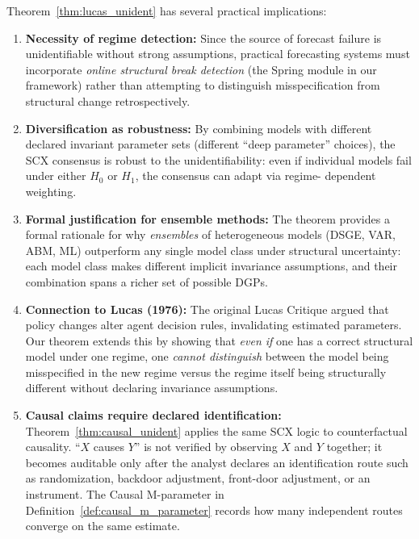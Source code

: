 \documentclass[12pt,a4paper]{article}
\begin{document}
Theorem~\ref{thm:lucas_unident} has several practical implications:

\begin{enumerate}[label=(\arabic*), leftmargin=*]
    \item \textbf{Necessity of regime detection:} Since the source of
    forecast failure is unidentifiable without strong assumptions,
    practical forecasting systems must incorporate \emph{online
    structural break detection} (the Spring module in our framework)
    rather than attempting to distinguish misspecification from
    structural change retrospectively.

    \item \textbf{Diversification as robustness:} By combining models
    with different declared invariant parameter sets (different
    ``deep parameter'' choices), the SCX consensus is robust to
    the unidentifiability: even if individual models fail under
    either $H_0$ or $H_1$, the consensus can adapt via regime-
    dependent weighting.

    \item \textbf{Formal justification for ensemble methods:} The
    theorem provides a formal rationale for why \emph{ensembles} of
    heterogeneous models (DSGE, VAR, ABM, ML) outperform any single
    model class under structural uncertainty: each model class makes
    different implicit invariance assumptions, and their combination
    spans a richer set of possible DGPs.

    \item \textbf{Connection to Lucas (1976):} The original Lucas
    Critique argued that policy changes alter agent decision rules,
    invalidating estimated parameters.  Our theorem extends this by
    showing that \emph{even if} one has a correct structural model
    under one regime, one \emph{cannot distinguish} between the
    model being misspecified in the new regime versus the regime
    itself being structurally different without declaring invariance
    assumptions.

    \item \textbf{Causal claims require declared identification:}
    Theorem~\ref{thm:causal_unident} applies the same SCX logic to
    counterfactual causality.  ``$X$ causes $Y$'' is not verified by
    observing $X$ and $Y$ together; it becomes auditable only after the
    analyst declares an identification route such as randomization,
    backdoor adjustment, front-door adjustment, or an instrument.  The
    Causal M-parameter in Definition~\ref{def:causal_m_parameter}
    records how many independent routes converge on the same estimate.
\end{enumerate}
\end{document}
